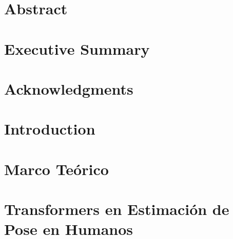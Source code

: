 \documentclass[12pt, oneside]{book}
\begin{document}
\chapter{Abstract}

\chapter{Executive Summary}


\chapter{Acknowledgments}


\tableofcontents

\listoffigures

\mainmatter

\chapter{Introduction}


\chapter{Marco Teórico}





\chapter{Transformers en Estimación de Pose en Humanos}

\end{document}
